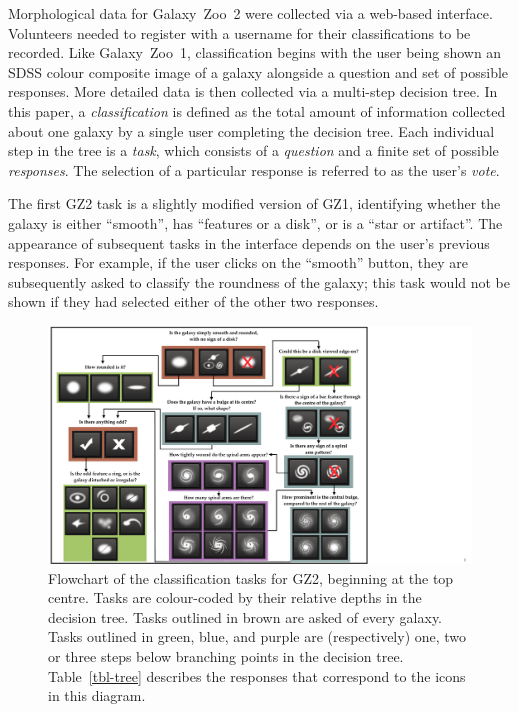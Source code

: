 \documentclass[useAMS,usenatbib]{mn2e}
\begin{document}
Morphological data for Galaxy~Zoo~2 were collected via a web-based interface. Volunteers needed to register with a username for their classifications to be recorded. Like Galaxy~Zoo~1, classification begins with the user being shown an SDSS colour composite image of a galaxy alongside a question and set of possible responses. More detailed data is then collected via a multi-step decision tree. In this paper, a {\it classification} is defined as the total amount of information collected about one galaxy by a single user completing the decision tree. Each individual step in the tree is a {\it task}, which consists of a {\it question} and a finite set of possible {\it responses}. The selection of a particular response is referred to as the user's {\it vote}.  

The first GZ2 task is a slightly modified version of GZ1, identifying whether the galaxy is either ``smooth'', has ``features or a disk'', or is a ``star or artifact''. The appearance of subsequent tasks in the interface depends on the user's previous responses. For example, if the user clicks on the ``smooth'' button, they are subsequently asked to classify the roundness of the galaxy; this task would not be shown if they had selected either of the other two responses. 

\begin{figure}
\includegraphics[angle=0,width=7.0in]{figures/flowchart.pdf}
\caption{Flowchart of the classification tasks for GZ2, beginning at the top centre. Tasks are colour-coded by their relative depths in the decision tree. Tasks outlined in brown are asked of every galaxy. Tasks outlined in green, blue, and purple are (respectively) one, two or three steps below branching points in the decision tree. Table~\ref{tbl-tree} describes the responses that correspond to the icons in this diagram.
\label{fig-flowchart}}
\end{figure}
\end{document}
